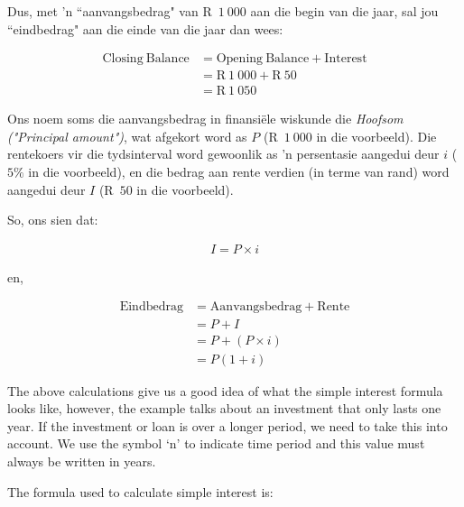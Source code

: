 Dus, met ’n “aanvangsbedrag" van R~$1~000$ aan die begin van die jaar, sal jou “eindbedrag" aan die einde van die
jaar dan wees:\par 
\begin{align*}
    \mathrm{Closing~Balance} &= \mathrm{Opening~Balance + Interest}\\
    &= \text{R}~1~000 + \text{R}~50\\
    &= \text{R}~1~050
\end{align*}

Ons noem soms die aanvangsbedrag in finansiële wiskunde die \textsl{Hoofsom ("Principal amount")}, wat afgekort word as $P$ (R~$1~000$ in die voorbeeld). Die rentekoers vir die tydsinterval word gewoonlik as ’n persentasie aangedui deur $i$ ($5\%$ in die voorbeeld),  en die bedrag aan rente verdien (in terme van rand) word aangedui deur $I$ (R~$50$ in die voorbeeld).\par 

So, ons sien dat:
        
\begin{align}
    I = P \times i
\end{align}

en,

\begin{align}
    \mathrm{Eindbedrag} &= \mathrm{Aanvangsbedrag + Rente} \nonumber\\
    &= P + I \nonumber\\
    &= P + (P \times i)\nonumber\\
    &= P(1 + i)
\end{align}



The above calculations give us a good idea of what the simple interest formula looks like, however, the example talks
about an investment that only lasts one year. If the investment or loan is over a longer period, we need to take this
into account. We use the symbol ‘n’ to indicate time period and this value must always be written in years.\par

The formula used to calculate simple interest is:





